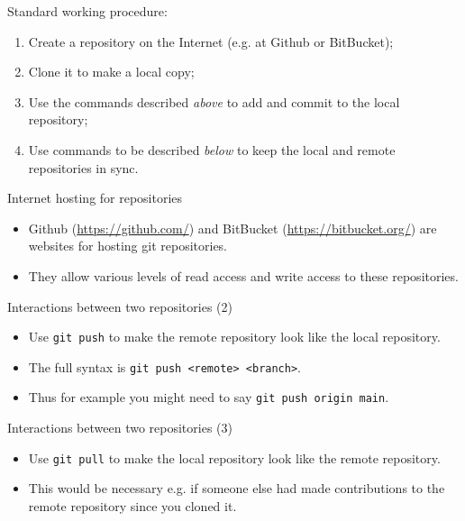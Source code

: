 \documentclass[usenames,dvipsnames]{beamer}
\newcommand{\code}[1]{\colorbox{light-gray}{\texttt{#1}}}
\begin{document}
\begin{frame}{Standard working procedure:}
  \begin{block}{}
    \begin{enumerate}
      \item{Create a repository on the Internet (e.g. at Github or BitBucket);}
      \item{Clone it to make a local copy;}
      \item{Use the commands described \textit{above} to add and commit to the local repository;}
      \item{Use commands to be described \textit{below} to keep the local and remote repositories in sync.}
    \end{enumerate}
  \end{block}
\end{frame}

\begin{frame}{Internet hosting for repositories}
  \begin{block}{}
    \begin{itemize}
      \item{Github (\url{https://github.com/}) and BitBucket (\url{https://bitbucket.org/}) are websites for hosting git repositories.}
      \item{They allow various levels of read access and write access to these repositories.}
    \end{itemize}
  \end{block}
\end{frame}

\begin{frame}{Interactions between two repositories (2)}
  \begin{block}{}
    \begin{itemize}
      \item{Use \code{git push} to make the remote repository look like the local repository.}
      \item{The full syntax is \code{git push <remote> <branch>}.}
      \item{Thus for example you might need to say \code{git push origin main}.}
    \end{itemize}
  \end{block}
\end{frame}

\begin{frame}{Interactions between two repositories (3)}
  \begin{block}{}
    \begin{itemize}
      \item{Use \code{git pull} to make the local repository look like the remote repository.}
      \item{This would be necessary e.g. if someone else had made contributions to the remote repository since you cloned it.}
    \end{itemize}
  \end{block}
\end{frame}
\end{document}

